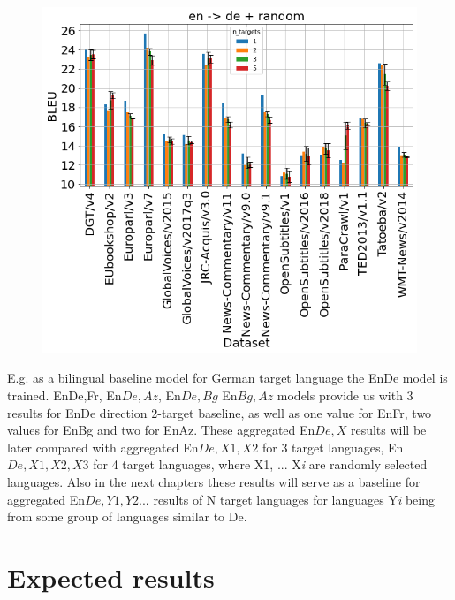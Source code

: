 \section{}
\label{section:multilingual_baseline}

\begin{figure}[h]
	\centering
	\includegraphics[width=1.0\columnwidth]{../img/random_en_de.png}
	\label{fig:random_en_de}
\end{figure}

E.g. as a bilingual baseline model for German target language the En\to{}De
model is trained.
En\to{}De,Fr, En\to{}${De,Az}$, En\to{}${De,Bg}$ En\to{}${Bg,Az}$ models
provide us with 3 results for En\to{}De direction 2-target baseline, as well
as one value for En\to{}Fr, two values for En\to{}Bg and two for En\to{}Az.
These aggregated En\to{}${De,X}$ results will be later compared with
aggregated En\to{}${De,X1,X2}$ for 3 target languages,
En\to{}${De,X1,X2,X3}$ for 4 target languages, where X1, ... X\textit{i} are
randomly selected languages.
Also in the next chapters these results will serve as a baseline for
aggregated En\to{}${De,Y1,Y2...}$ results of N target languages for languages
Y\textit{i} being from some group of languages similar to De.

\section{Expected results}


